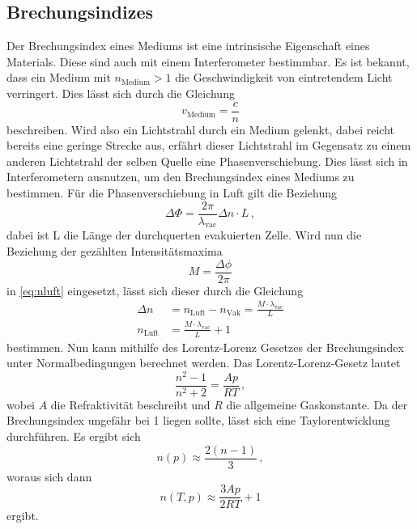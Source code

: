 \subsection{Brechungsindizes} \label{sec:n}

Der Brechungsindex eines Mediums ist eine intrinsische Eigenschaft eines Materials.
Diese sind auch mit einem Interferometer bestimmbar.
Es ist bekannt, dass ein Medium mit $n_\text{Medium} > 1$ die Geschwindigkeit von eintretendem Licht verringert.
Dies lässt sich durch die Gleichung
\begin{equation*}
    v_\text{Medium} = \frac{c}{n}
\end{equation*}
beschreiben. Wird also ein Lichtstrahl durch ein Medium gelenkt, 
dabei reicht bereits eine geringe Strecke aus, 
erfährt dieser Lichtstrahl im Gegensatz zu einem anderen Lichtstrahl der selben Quelle eine Phasenverschiebung.
Dies lässt sich in Interferometern ausnutzen, um den Brechungsindex eines Mediums zu bestimmen.
Für die Phasenverschiebung in Luft gilt die Beziehung \cite{v64}
\begin{equation} \label{eq:nluft}
    \Delta \Phi = \frac{2 \pi}{\lambda_\text{vac}} \Delta n \cdot L \, ,
\end{equation}
dabei ist L die Länge der durchquerten evakuierten Zelle.
Wird nun die Beziehung der gezählten Intensitätsmaxima 
\begin{equation} \label{eq:maxima}
    M = \frac{\Delta \phi}{2 \pi}
\end{equation}
in \autoref{eq:nluft} eingesetzt, lässt sich dieser durch die Gleichung
\begin{align} \label{eq:nluft2}
    \Delta n &= n_\text{Luft} - n_\text{Vak} = \frac{M \cdot \lambda_\text{vac}}{L} \nonumber \\
    n_\text{Luft} &= \frac{M \cdot \lambda_\text{vac}}{L} + 1
\end{align}
bestimmen.
Nun kann mithilfe des Lorentz-Lorenz Gesetzes der Brechungsindex unter Normalbedingungen berechnet werden.
Das Lorentz-Lorenz-Gesetz lautet
\begin{equation*}
    \frac{n^2 - 1}{n^2 + 2} = \frac{A p}{R T} \, ,
\end{equation*}
wobei $A$ die Refraktivität beschreibt und $R$ die allgemeine Gaskonstante.
Da der Brechungsindex ungefähr bei 1 liegen sollte, lässt sich eine Taylorentwicklung durchführen. Es ergibt sich
\begin{equation*}
    n(p) \approx \frac{2 (n-1)}{3} \, ,
\end{equation*} 
woraus sich dann
\begin{equation} \label{eq:lorentz}
    n (T,p) \approx \frac{3 A p}{ 2 R T} + 1
\end{equation}
ergibt.

